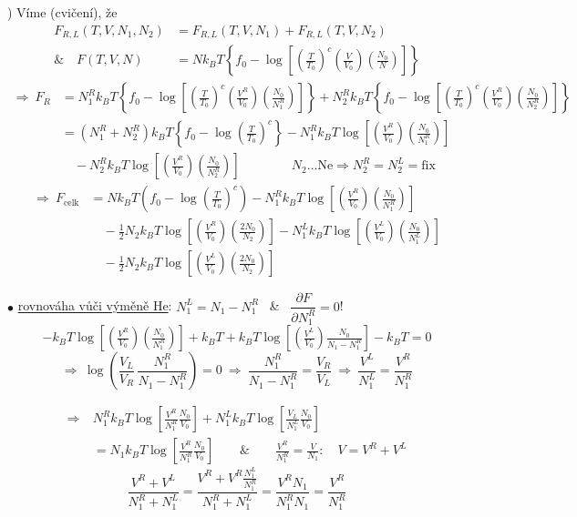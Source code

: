 \begin{priklad}
) Víme (cvičení), že
\begin{align*}
  F_{R,L}(T,V,N_1,N_2) &= F_{R,L}(T,V,N_1) + F_{R,L}(T,V,N_2) \\
  \&\quad F(T,V,N) &= Nk_BT\left\{f_0 - \log\left[\left(\frac{T}{T_0}\right)^c\left(\frac{V}{V_0}\right)\left(\frac{N_0}{N}\right)\right]\right\}
\end{align*}
\begin{align*}
  \Rightarrow\ F_R &= N_1^Rk_BT\left\{f_0 - \log\left[\left(\tfrac{T}{T_0}\right)^c\left(\tfrac{V^R}{V_0}\right)\left(\tfrac{N_0}{N_1^R}\right)\right]\right\}
   + N_2^Rk_BT\left\{f_0 - \log\left[\left(\tfrac{T}{T_0}\right)^c\left(\tfrac{V^R}{V_0}\right)\left(\tfrac{N_0}{N_2^R}\right)\right]\right\} \\
  &= (N_1^R + N_2^R)k_BT\left\{f_0 - \log\left(\tfrac{T}{T_0}\right)^c\right\}
   - N_1^Rk_BT\log\left[\left(\tfrac{V^R}{V_0}\right)\left(\tfrac{N_0}{N_1^R}\right)\right] \\
  &\quad - N_2^Rk_BT\log\left[\left(\tfrac{V^R}{V_0}\right)\left(\tfrac{N_0}{N_2^R}\right)\right]
  \qquad\qquad N_2 \dots \text{Ne} \Rightarrow N_2^R = N_2^L = \text{fix}
\end{align*}
\begin{align*}
  \Rightarrow\ F_{\text{celk}} &= Nk_BT\left(f_0 - \log\left(\tfrac{T}{T_0}\right)^c\right)
   - N_1^Rk_BT\log\left[\left(\tfrac{V^R}{V_0}\right)\left(\tfrac{N_0}{N_1^R}\right)\right] \\
  &\quad - \tfrac12N_2k_BT\log\left[\left(\tfrac{V^R}{V_0}\right)\left(\tfrac{2N_0}{N_2}\right)\right]
   - N_1^Lk_BT\log\left[\left(\tfrac{V^L}{V_0}\right)\left(\tfrac{N_0}{N_1^L}\right)\right] \\
  &\quad - \tfrac12N_2k_BT\log\left[\left(\tfrac{V^L}{V_0}\right)\left(\tfrac{2N_0}{N_2}\right)\right]
\end{align*}

$\bullet$ \underline{rovnováha vůči výměně He}: \quad $N_1^L = N_1 - N_1^R$ \ \& \ $\dfrac{\partial F}{\partial N_1^R} = 0$!
\[
  -k_BT\log\left[\left(\tfrac{V^R}{V_0}\right)\left(\tfrac{N_0}{N_1^R}\right)\right] + k_BT
  + k_BT\log\left[\left(\tfrac{V^L}{V_0}\right)\tfrac{N_0}{N_1 - N_1^R}\right] - k_BT = 0
\]
\[
  \Rightarrow\ \log\left(\frac{V_L}{V_R}\,\frac{N_1^R}{N_1 - N_1^R}\right) = 0
  \ \Rightarrow\ \frac{N_1^R}{N_1 - N_1^R} = \frac{V_R}{V_L}
  \ \Rightarrow\ \frac{V^L}{N_1^L} = \frac{V^R}{N_1^R}
\]
\end{priklad}

\begin{align*}
  \Rightarrow\ &N_1^Rk_BT\log\left[\frac{V^R}{N_1^R}\frac{N_0}{V_0}\right] + N_1^Lk_BT\log\left[\frac{V_L}{N_1^L}\frac{N_0}{V_0}\right] \\
  &= N_1k_BT\log\left[\frac{V^R}{N_1^R}\frac{N_0}{V_0}\right]
  \qquad\&\qquad \frac{V^R}{N_1^R} = \frac{V}{N_1}: \quad V = V^R + V^L
\end{align*}
\[
  \frac{V^R + V^L}{N_1^R + N_1^L} = \frac{V^R + V^R\frac{N_1^L}{N_1^R}}{N_1^R + N_1^L} = \frac{V^RN_1}{N_1^RN_1} = \frac{V^R}{N_1^R}
\]

